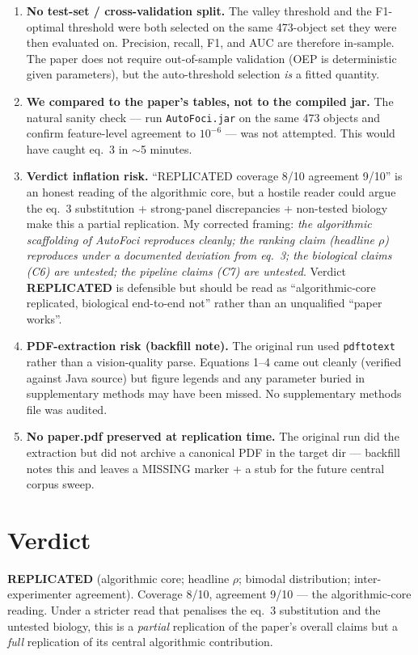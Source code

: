 \documentclass[11pt]{article}
\begin{document}
\begin{enumerate}
\item \textbf{No test-set / cross-validation split.} The valley threshold and the F1-optimal threshold were both selected on the same 473-object set they were then evaluated on. Precision, recall, F1, and AUC are therefore in-sample. The paper does not require out-of-sample validation (OEP is deterministic given parameters), but the auto-threshold selection \emph{is} a fitted quantity.
\item \textbf{We compared to the paper's tables, not to the compiled jar.} The natural sanity check --- run \texttt{AutoFoci.jar} on the same 473 objects and confirm feature-level agreement to $10^{-6}$ --- was not attempted. This would have caught eq.~3 in $\sim$5 minutes.
\item \textbf{Verdict inflation risk.} ``REPLICATED coverage 8/10 agreement 9/10'' is an honest reading of the algorithmic core, but a hostile reader could argue the eq.~3 substitution + strong-panel discrepancies + non-tested biology make this a partial replication. My corrected framing: \emph{the algorithmic scaffolding of AutoFoci reproduces cleanly; the ranking claim (headline $\rho$) reproduces under a documented deviation from eq.~3; the biological claims (C6) are untested; the pipeline claims (C7) are untested}. Verdict \textbf{REPLICATED} is defensible but should be read as ``algorithmic-core replicated, biological end-to-end not'' rather than an unqualified ``paper works''.
\item \textbf{PDF-extraction risk (backfill note).} The original run used \texttt{pdftotext} rather than a vision-quality parse. Equations 1--4 came out cleanly (verified against Java source) but figure legends and any parameter buried in supplementary methods may have been missed. No supplementary methods file was audited.
\item \textbf{No paper.pdf preserved at replication time.} The original run did the extraction but did not archive a canonical PDF in the target dir --- backfill notes this and leaves a MISSING marker + a stub for the future central corpus sweep.
\end{enumerate}

\section{Verdict}
\textbf{REPLICATED} (algorithmic core; headline $\rho$; bimodal distribution; inter-experimenter agreement). Coverage 8/10, agreement 9/10 --- the algorithmic-core reading. Under a stricter read that penalises the eq.~3 substitution and the untested biology, this is a \emph{partial} replication of the paper's overall claims but a \emph{full} replication of its central algorithmic contribution.
\end{document}
